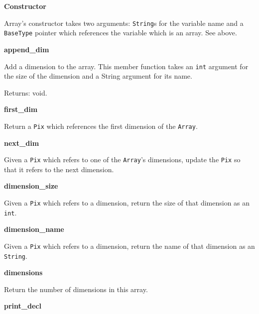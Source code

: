\begin{description}

\item {\bf Constructor}


Array's constructor takes two arguments: {\tt String}s for the variable name
and a {\tt BaseType} pointer which references the variable which is an
array. See above.

\item {\bf append\_dim}


Add a dimension to the array. This member function takes an {\tt int}
argument for the size of the dimension and a String argument for its name.

Returns: void.

\item {\bf first\_dim}


Return a {\tt Pix} which references the first dimension of the {\tt Array}.

\item {\bf next\_dim}


Given a {\tt Pix} which refers to one of the {\tt Array}'s dimensions, update
the {\tt Pix} so that it refers to the next dimension.

\item {\bf dimension\_size}


Given a {\tt Pix} which refers to a dimension, return the size of that
dimension as an {\tt int}.

\item {\bf dimension\_name}


Given a {\tt Pix} which refers to a dimension, return the name of that
dimension as an {\tt String}.

\item {\bf dimensions}


Return the number of dimensions in this array.

\item {\bf print\_decl}


\end{description}
